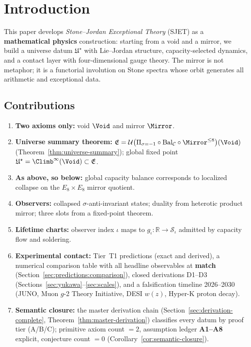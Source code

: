 \section{Introduction}
\label{sec:intro}

This paper develops \emph{Stone--Jordan Exceptional Theory} (SJET) as a
\textbf{mathematical physics} construction: starting from a void and a mirror,
we build a universe datum $\mathfrak{U}^\star$ with Lie--Jordan structure,
capacity-selected dynamics, and a contact layer with four-dimensional gauge
theory. The mirror is not metaphor; it is a functorial involution on Stone
spectra whose orbit generates all arithmetic and exceptional data.

\subsection{Contributions}

\begin{enumerate}[label=(\roman*),leftmargin=*]
  \item \textbf{Two axioms only:} void $\Void$ and mirror $\Mirror$.
  \item \textbf{Universe summary theorem:}
    $\mathfrak{E}=\mathcal{U}\bigl(\Pi_{\sigma=-1}\circ\mathrm{Bal}_{\mathcal{C}}\circ\Mirror^{\leq 8}\bigr)(\Void)$
    (Theorem~\ref{thm:universe-summary}); global fixed point
    $\mathfrak{U}^\star=\Climb^\infty(\Void)\subset\mathfrak{E}$.
  \item \textbf{As above, so below:} global capacity balance corresponds to
    localized collapse on the $E_8\times E_8$ mirror quotient.
  \item \textbf{Observers:} collapsed $\sigma$-anti-invariant states; duality
    from heterotic product mirror; three slots from a fixed-point theorem.
  \item \textbf{Lifetime charts:} observer index $\iota$ maps to
    $g_\iota:\mathbb{R}\to\mathcal{S}_\iota$ admitted by capacity flow and
    soldering.
  \item \textbf{Experimental contact:} Tier~T1 predictions (exact and derived),
    a numerical comparison table with all headline observables at
    \textbf{match} (Section~\ref{sec:predictions:comparison}),
    closed derivations D1--D3 (Sections~\ref{sec:yukawa}--\ref{sec:scales}),
    and a falsification timeline 2026--2030 (JUNO, Muon $g$-2 Theory
    Initiative, DESI $w(z)$, Hyper-K proton decay).
  \item \textbf{Semantic closure:} the master derivation chain
    (Section~\ref{sec:derivation-complete}, Theorem~\ref{thm:master-derivation})
    classifies every datum by proof tier (A/B/C); primitive axiom count $=2$,
    assumption ledger \textbf{A1--A8} explicit, conjecture count $=0$
    (Corollary~\ref{cor:semantic-closure}).
\end{enumerate}

